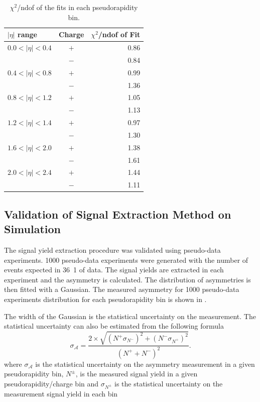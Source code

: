 \begin{table}[htbp]
\begin{center}
\begin{tabular}{lcr}
    \toprule
$|\eta|$ range &Charge & $\chi^2$/ndof of Fit\\
\midrule
$0.0<| \eta |<0.4$ &$+$&  0.86\\
                   &$-$&  0.84\\
$0.4<| \eta |<0.8$ &$+$&  0.99\\
                   &$-$&  1.36\\
$0.8<| \eta |<1.2$ &$+$&  1.05\\
                   &$-$&  1.13\\
$1.2<| \eta |<1.4$ &$+$&  0.97\\
                   &$-$&  1.30\\
$1.6<| \eta |<2.0$ &$+$&  1.38\\
                   &$-$&  1.61\\
$2.0<| \eta |<2.4$ &$+$&  1.44\\
                   &$-$&  1.11\\
    \bottomrule
\end{tabular}
\caption[$\chi^2$/ndof of the fits in each pseudorapidity
bin.]{\label{tab:chi2}$\chi^2$/ndof of the fits in each pseudorapidity
bin\cite{baisini2010electron}.}
\end{center}
\end{table}


\subsection{Validation of Signal Extraction Method on Simulation}

The signal yield extraction procedure was validated using pseudo-data
experiments. 1000 pseudo-data experiments were generated with the number of
events expected in \unit{36.1}{\invpb} of data. The signal yields are extracted
in each experiment and the asymmetry is calculated. The distribution of
asymmetries is then fitted with a Gaussian.
The measured asymmetry for 1000 pseudo-data experiments distribution for each
pseudorapidity bin is shown in .

The width of the Gaussian is the statistical uncertainty on the measurement.
The statistical uncertainty can also be estimated from the following formula
\begin{equation}
  \label{tab:statuncert}
\sigma_\mathcal{A} = 
\frac{ 
  2 \times \sqrt{ \left( N^+ \sigma_{N^-} \right)^2 + \left( N^- \sigma_{N^+} \right)^2 } 
}
{ 
  \left( N^{+} + N^{-} \right)^2 
} .
\end{equation}
where $\sigma_\mathcal{A}$ is the statistical uncertainty on the asymmetry
measurement in a given pseudorapidity bin, $N^{\pm}$, is the measured signal
yield in a given pseudorapidity/charge bin and $\sigma_{N^\pm}$ is the
statistical uncertainty on the measurement signal yield in each bin


